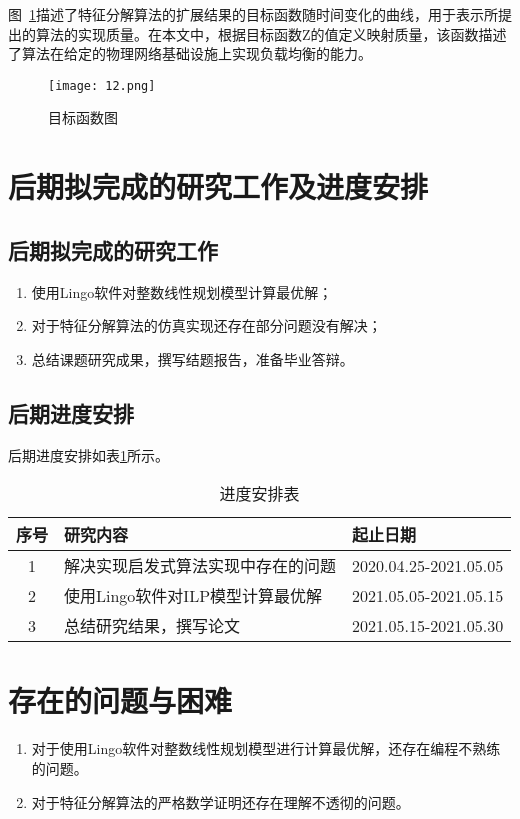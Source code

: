 图~\ref{figure:12}描述了特征分解算法的扩展结果的目标函数随时间变化的曲线，用于表示所提出的算法的实现质量。在本文中，根据目标函数Z的值定义映射质量，该函数描述了算法在给定的物理网络基础设施上实现负载均衡的能力。\par
\begin{figure}[H]
    \centering
    \texttt{[image: 12.png]}
    \caption{目标函数图}
    \label{figure:12}
\end{figure}

\section{后期拟完成的研究工作及进度安排}

\subsection{后期拟完成的研究工作}
\begin{enumerate}
    \setlength{\itemsep}{0pt}
    \setlength{\parsep}{0pt}
    \setlength{\parskip}{0pt}
    \setlength{\topsep}{0pt}
    \setlength{\partopsep}{0pt}
    \item 使用Lingo软件对整数线性规划模型计算最优解；
    \item 对于特征分解算法的仿真实现还存在部分问题没有解决；
    \item 总结课题研究成果，撰写结题报告，准备毕业答辩。
\end{enumerate}
\subsection{后期进度安排}
后期进度安排如表\ref{table:4}所示。
\begin{table}[H]
    \centering
    \caption{进度安排表}
    \label{table:4}
    \begin{tabular}{cll}
        \toprule
        序号&研究内容&起止日期\\
        \midrule
        1&解决实现启发式算法实现中存在的问题&2020.04.25-2021.05.05\\
        \midrule
        2&使用Lingo软件对ILP模型计算最优解&2021.05.05-2021.05.15\\
        \midrule
        3&总结研究结果，撰写论文&2021.05.15-2021.05.30\\
        \bottomrule
    \end{tabular}
\end{table}

\section{存在的问题与困难}
\begin{enumerate}
    \setlength{\itemsep}{0pt}
    \setlength{\parsep}{0pt}
    \setlength{\parskip}{0pt}
    \setlength{\topsep}{0pt}
    \setlength{\partopsep}{0pt}
    \item 对于使用Lingo软件对整数线性规划模型进行计算最优解，还存在编程不熟练的问题。
    \item 对于特征分解算法的严格数学证明还存在理解不透彻的问题。
\end{enumerate}
